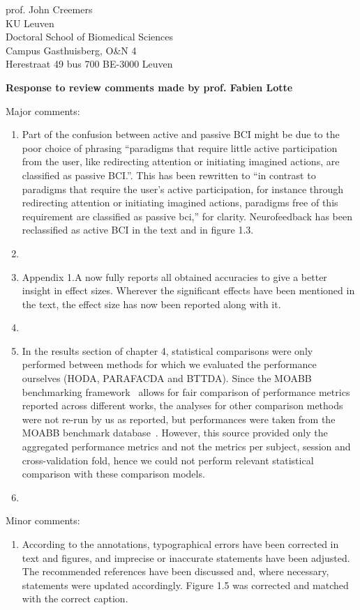 \documentclass{letter}
\newcommand{\reply}[1]{%
	\textbf{Response to review comments made by prof. #1}

}
\begin{document}
\begin{letter}{
	prof. John Creemers \\
	KU Leuven \\
	Doctoral School of Biomedical Sciences \\
	Campus Gasthuisberg, O\&N 4 \\
	Herestraat 49 bus 700
	BE-3000 Leuven

}
\reply{Fabien Lotte}
Major comments:
\begin{enumerate}
	\item Part of the confusion between active and passive BCI might be due
	to the poor choice of phrasing ``paradigms that require little active
  participation from the user, like redirecting attention or initiating imagined actions, are classified as passive BCI.''.
	This has been rewritten to ``in contrast to paradigms that require the user's active participation, for
	instance through redirecting attention or initiating imagined actions,
	paradigms free of this requirement are classified as passive bci,''
	for clarity.
	Neurofeedback has been reclassified as active BCI in the text and in
	figure 1.3.
	\item {}
  \item Appendix 1.A now fully reports all obtained accuracies to give a better
    insight in effect sizes. Wherever the significant effects have been mentioned
    in the text, the effect size has now been reported along with it.
	\item {}
	\item In the results section of chapter 4, statistical comparisons were
	only performed between methods for which we evaluated the performance
	ourselves (HODA, PARAFACDA and BTTDA).
	Since the MOABB benchmarking framework~\cite{Aristimunha2023} allows for
	fair comparison of performance metrics reported across different works,
	the analyses for other comparison methods were not re-run
	by us as reported, but performances were
	taken from the MOABB benchmark database~\cite{Chevallier2024}.
	However, this source provided only the aggregated performance metrics
	and not the metrics per subject, session and cross-validation fold,
	hence we could not perform relevant statistical comparison with these
	comparison models.
	\item {}
\end{enumerate}
Minor comments:
\begin{enumerate}
	\item According to the annotations, typographical errors have been
	corrected in text and figures, and imprecise or inaccurate statements have been adjusted.
	The recommended references have been discussed and, where necessary,
	statements were updated accordingly.
  Figure 1.5 was corrected and matched with the correct caption.
\end{enumerate}


\end{letter}
\end{document}
